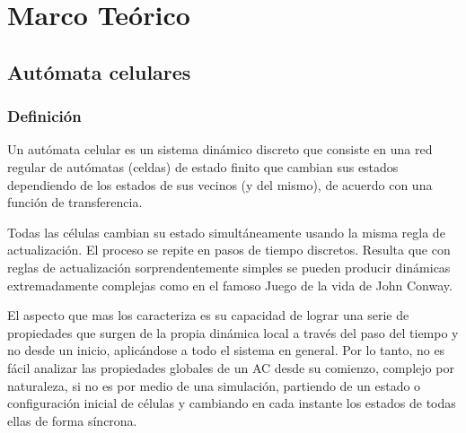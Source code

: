 \documentclass[12pt, fleqn]{report}                             %
\theoremstyle{break}                                            %
\begin{document}
\restoregeometry                                                    %
\nopagecolor                                                        %




\tableofcontents{}
\label{sec:Index}

\clearpage


\part{Marco Teórico}
\clearpage

  \chapter{Autómata celulares}

        \clearpage
        \section{Definición}

        Un autómata celular es un sistema dinámico discreto que consiste en una red regular
        de autómatas (celdas) de estado finito que cambian sus estados dependiendo de los estados de sus
        vecinos (y del mismo), de acuerdo con una función de transferencia. 
        
        Todas las células cambian su estado simultáneamente usando la misma regla de actualización. 
        El proceso se repite en pasos de tiempo discretos. 
        Resulta que con reglas de actualización sorprendentemente simples se pueden producir 
        dinámicas extremadamente complejas como en el famoso Juego de la vida de John Conway.  \cite{Kari}

        El aspecto que mas los caracteriza es su capacidad de lograr una serie de propiedades 
        que surgen de la propia dinámica local a través del paso del tiempo y no desde un inicio, 
        aplicándose a todo el sistema en general. Por lo tanto, no es fácil analizar las propiedades 
        globales de un AC desde su comienzo, complejo por naturaleza, si no es por medio de una 
        simulación, partiendo de un estado o configuración inicial de células y cambiando en cada
        instante los estados de todas ellas de forma síncrona.
        
\end{document}
